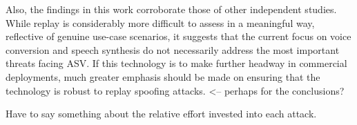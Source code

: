 Also, the findings in this work corroborate those of other independent studies.  While replay is considerably more difficult to assess in a meaningful way, reflective of genuine use-case scenarios, it suggests that the current focus on voice conversion and speech synthesis do not necessarily address the most important threats facing ASV.  If this technology is to make further headway in commercial deployments, much greater emphasis should be made on ensuring that the technology is robust to replay spoofing attacks. <-- perhaps for the conclusions?

Have to say something about the relative effort invested into each attack.

